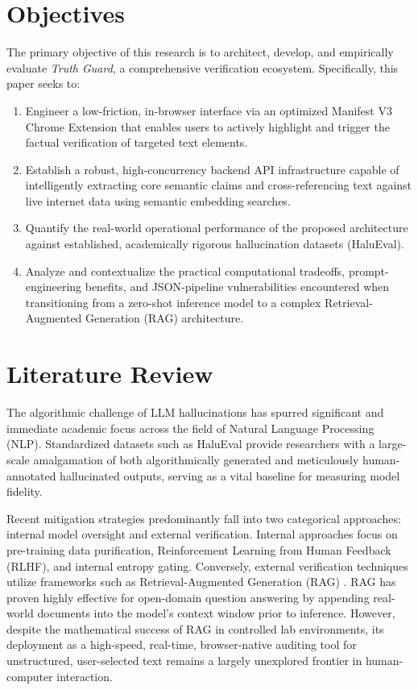 \documentclass[conference]{IEEEtran}
\begin{document}
\section{Objectives}
The primary objective of this research is to architect, develop, and empirically evaluate \textit{Truth Guard}, a comprehensive verification ecosystem. Specifically, this paper seeks to:
\begin{enumerate}
    \item Engineer a low-friction, in-browser interface via an optimized Manifest V3 Chrome Extension that enables users to actively highlight and trigger the factual verification of targeted text elements.
    \item Establish a robust, high-concurrency backend API infrastructure capable of intelligently extracting core semantic claims and cross-referencing text against live internet data using semantic embedding searches.
    \item Quantify the real-world operational performance of the proposed architecture against established, academically rigorous hallucination datasets (HaluEval).
    \item Analyze and contextualize the practical computational tradeoffs, prompt-engineering benefits, and JSON-pipeline vulnerabilities encountered when transitioning from a zero-shot inference model to a complex Retrieval-Augmented Generation (RAG) architecture.
\end{enumerate}

\section{Literature Review}
The algorithmic challenge of LLM hallucinations has spurred significant and immediate academic focus across the field of Natural Language Processing (NLP). Standardized datasets such as HaluEval \cite{halueval} provide researchers with a large-scale amalgamation of both algorithmically generated and meticulously human-annotated hallucinated outputs, serving as a vital baseline for measuring model fidelity. 

Recent mitigation strategies predominantly fall into two categorical approaches: internal model oversight and external verification. Internal approaches focus on pre-training data purification, Reinforcement Learning from Human Feedback (RLHF), and internal entropy gating. Conversely, external verification techniques utilize frameworks such as Retrieval-Augmented Generation (RAG) \cite{rag}. RAG has proven highly effective for open-domain question answering by appending real-world documents into the model's context window prior to inference. However, despite the mathematical success of RAG in controlled lab environments, its deployment as a high-speed, real-time, browser-native auditing tool for unstructured, user-selected text remains a largely unexplored frontier in human-computer interaction.
\end{document}

